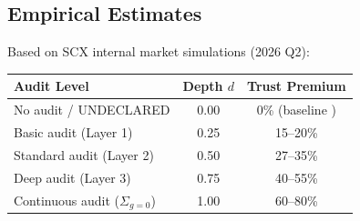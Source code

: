 \documentclass[11pt,a4paper]{article}
\theoremstyle{definition}
\theoremstyle{remark}
\newcommand{\undeclaredState}{\textsf{UNDECLARED}}
\newcommand{\sumGZero}{\Sigma_{g=0}}
\begin{document}
\subsection{Empirical Estimates}
Based on SCX internal market simulations (2026 Q2):
\begin{center}
\begin{tabular}{lcc}
\toprule
\textbf{Audit Level } & \textbf{Depth $d$} & \textbf{Trust Premium } \\
\midrule
No audit / \undeclaredState{}  & 0.00 & 0\% (baseline ) \\
Basic audit (Layer 1)  & 0.25 & 15--20\% \\
Standard audit (Layer 2)  & 0.50 & 27--35\% \\
Deep audit (Layer 3)  & 0.75 & 40--55\% \\
Continuous audit ($\sumGZero$)  & 1.00 & 60--80\% \\
\bottomrule
\end{tabular}
\end{center}
\end{document}
